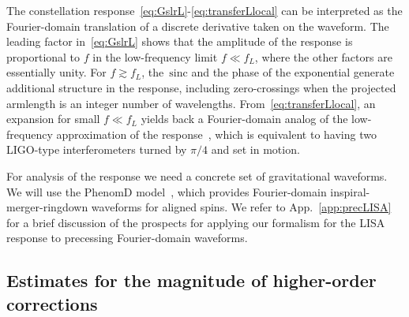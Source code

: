 \documentclass[aps,showpacs,twocolumn,
prd,superscriptaddress,nofootinbib]{revtex4-1}
\newcommand{\sinc}{\,\mathrm{sinc}}
\begin{document}
The constellation response~\eqref{eq:GslrL}-\eqref{eq:transferLlocal} can be interpreted as the Fourier-domain translation of a discrete derivative taken on the waveform. The leading factor in~\eqref{eq:GslrL} shows that the amplitude of the response is proportional to $f$ in the low-frequency limit $f\ll f_{L}$, where the other factors are essentially unity. For $f\gtrsim f_{L}$, the $\sinc$ and the phase of the exponential generate additional structure in the response, including zero-crossings when the projected armlength is an integer number of wavelengths. From~\eqref{eq:transferLlocal}, an expansion for small $f\ll f_{L}$ yields back a Fourier-domain analog of the low-frequency approximation of the response~\cite{Cutler97, RCP04}, which is equivalent to having two LIGO-type interferometers turned by $\pi/4$ and set in motion.

For analysis of the response we need a concrete set of gravitational waveforms. We will use the PhenomD model~\cite{Khan+15,Husa+15}, which provides Fourier-domain inspiral-merger-ringdown waveforms for aligned spins. We refer to App.~\ref{app:precLISA} for a brief discussion of the prospects for applying our formalism for the LISA response to precessing Fourier-domain waveforms.


\subsection{Estimates for the magnitude of higher-order corrections}
\label{subsec:lisafom}
\end{document}
